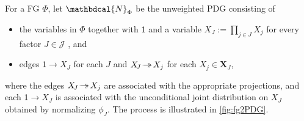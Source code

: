 \documentclass[letterpaper]{article} %
\theoremstyle{plain}
\theoremstyle{definition}
\theoremstyle{remark}
\newcommand{\valpha}[1]{#1}
\newcommand\mat[1]{\mathbf{#1}}
\newcommand{\tto}{\rightarrow\mathrel{\mspace{-15mu}}\rightarrow}
\newcommand{\bp}[1][L]{\mat{p}_{\!_{#1}\!}}
\newcommand{\dg}[1]{\mathbdcal{#1}}
\newcommand{\var}[1]{\mathsf{#1}}
\newcommand{\PDGof}[1]{{\dg M}_{#1}}
\newcommand{\UPDGof}[1]{{\dg N}_{#1}}
\begin{document}
\begin{defn} \label{def:fg2PDG}
For a FG $\Phi$, let $\UPDGof{\Phi}$ be
the unweighted PDG consisting of
\begin{itemize}
	\item the variables in $\Phi$ together
   with $\var 1$ and a variable $X_{\!J} := \prod_{j \in J} X_j$ for every factor $J \in \mathcal J$%
   , and
   \item edges ${\var 1} \!\to\! X_{\!J}$ for each $J$ and $X_{\!J} \!\tto\! X_j$ for each $X_j \in \mat X_J$,
\end{itemize}
where the edges $ X_{\!J} \!\tto\! X_j$ are associated with the appropriate projections, and each ${\var 1} \!\to\! X_{\!J}$ is associated with the unconditional joint distribution on $X_J$ obtained by normalizing $\phi_J$.
The process is illustrated in \cref{fig:fg2PDG}.

\end{defn}
\end{document}
